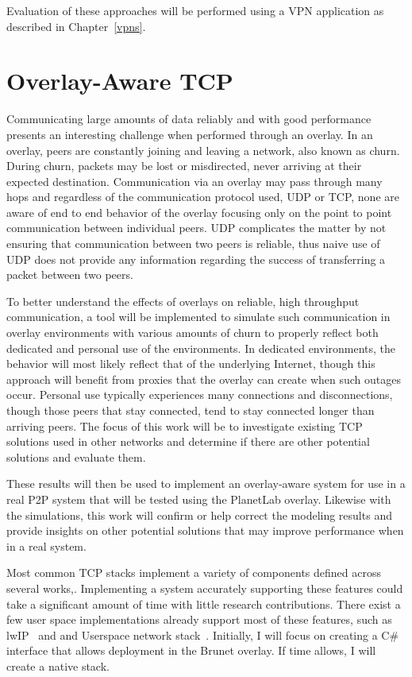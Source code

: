Evaluation of these approaches will be performed using a VPN application as
described in Chapter~\ref{vpns}.

\section{Overlay-Aware TCP}
\label{tcp}
Communicating large amounts of data reliably and with good performance presents
an interesting challenge when performed through an overlay.  In an overlay,
peers are constantly joining and leaving a network, also known as churn.  During
churn, packets may be lost or misdirected, never arriving at their expected
destination.  Communication via an overlay may pass through many hops and
regardless of the communication protocol used, UDP or TCP, none are aware of
end to end behavior of the overlay focusing only on the point to point
communication between individual peers.  UDP complicates the matter by not
ensuring that communication between two peers is reliable, thus naive use of
UDP does not provide any information regarding the success of transferring a
packet between two peers.

To better understand the effects of overlays on reliable, high throughput
communication, a tool will be implemented to simulate such communication in
overlay environments with various amounts of churn to properly reflect both
dedicated and personal use of the environments.  In dedicated environments, the
behavior will most likely reflect that of the underlying Internet, though this
approach will benefit from proxies that the overlay can create when such outages
occur.  Personal use typically experiences many connections and disconnections,
though those peers that stay connected, tend to stay connected longer than
arriving peers.  The focus of this work will be to investigate existing TCP
solutions used in other networks and determine if there are other potential
solutions and evaluate them.

These results will then be used to implement an overlay-aware system for use in
a real P2P system that will be tested using the PlanetLab overlay.  Likewise with
the simulations, this work will confirm or help correct the modeling results and
provide insights on other potential solutions that may improve performance when
in a real system.

Most common TCP stacks implement a variety of components defined across
several works,\cite{tcp, tcp_congestion, tcp_hp, tcp_mss,
tcp_congestion_notification, tcp_sack}.  Implementing a system accurately
supporting these features could take a significant amount of time with little
research contributions.  There exist a few user space implementations already
support most of these features, such as lwIP~\cite{lwip} and and Userspace
network stack~\cite{unetstack}.  Initially, I will focus on creating a C\#
interface that allows deployment in the Brunet overlay.  If time allows, I will
create a native stack.

